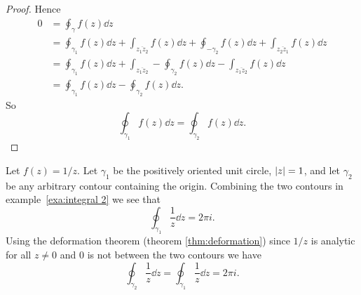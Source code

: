 \documentclass{article}
\begin{document}
\begin{proof}
        Hence
        \begin{align*}
            0 &= \oint_\gamma f(z)\dd{z}\\
            &= \oint_{\gamma_1} f(z)\dd{z} + \int_{\overline{z_1z_2}} f(z)\dd{z} + \oint_{-\gamma_2} f(z) \dd{z} + \int_{\overline{z_2z_1}} f(z)\dd{z}\\
            &= \oint_{\gamma_1} f(z)\dd{z} + \int_{\overline{z_1z_2}} - \oint_{\gamma_2} f(z)\dd{z} - \int_{\overline{z_1z_2}} f(z)\dd{z}\\
            &= \oint_{\gamma_1} f(z)\dd{z} - \oint_{\gamma_2} f(z)\dd{z}.
        \end{align*}
        So
        \[\oint_{\gamma_1} f(z)\dd{z} = \oint_{\gamma_2} f(z)\dd{z}.\]
    \end{proof}
    \begin{example}
        Let \(f(z) = 1/z\). Let \(\gamma_1\) be the positively oriented unit circle, \(\abs{z} = 1\), and let \(\gamma_2\) be any arbitrary contour containing the origin.
        Combining the two contours in example~\ref{exa:integral 2} we see that
        \[\oint_{\gamma_1}\frac{1}{z}\dd{z} = 2\pi i.\]
        Using the deformation theorem (theorem \ref{thm:deformation}) since \(1/z\) is analytic for all \(z \ne 0\) and \(0\) is not between the two contours we have
        \[\oint_{\gamma_2} \frac{1}{z}\dd{z} = \oint_{\gamma_1}\frac{1}{z} \dd{z} = 2\pi i.\]
    \end{example}
    
\end{document}
